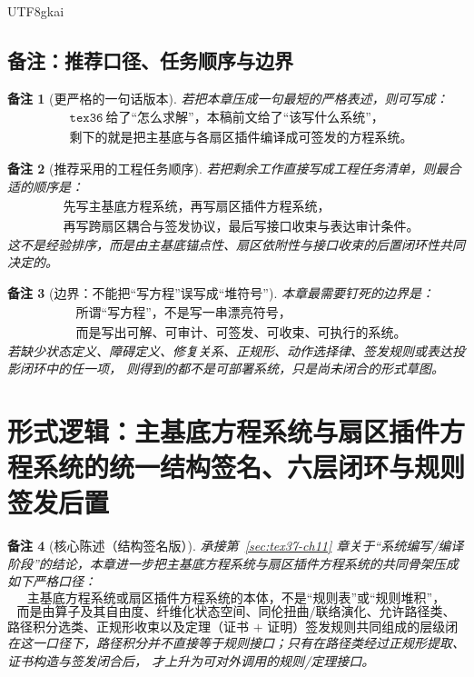 \documentclass[12pt]{article}
\newtheorem{remark}{备注}[section]
\begin{document}
\begin{CJK*}{UTF8}{gkai}
\subsection{备注：推荐口径、任务顺序与边界}
\label{subsec:tex37-ch11-remarks}

\begin{remark}[更严格的一句话版本]
若把本章压成一句最短的严格表述，则可写成：
\[
  \boxed{
    \begin{aligned}
      &\texttt{tex36}\ \text{给了“怎么求解”，本稿前文给了“该写什么系统”，}\\
      &\text{剩下的就是把主基底与各扇区插件编译成可签发的方程系统。}
    \end{aligned}
  }
\]
\end{remark}

\begin{remark}[推荐采用的工程任务顺序]
若把剩余工作直接写成工程任务清单，则最合适的顺序是：
\[
  \boxed{
    \begin{aligned}
      &\text{先写主基底方程系统，再写扇区插件方程系统，}\\
      &\text{再写跨扇区耦合与签发协议，最后写接口收束与表达审计条件。}
    \end{aligned}
  }
\]
这不是经验排序，而是由主基底锚点性、扇区依附性与接口收束的后置闭环性共同决定的。
\end{remark}

\begin{remark}[边界：不能把“写方程”误写成“堆符号”]
本章最需要钉死的边界是：
\[
  \boxed{
    \begin{aligned}
      &\text{所谓“写方程”，不是写一串漂亮符号，}\\
      &\text{而是写出可解、可审计、可签发、可收束、可执行的系统。}
    \end{aligned}
  }
\]
若缺少状态定义、障碍定义、修复关系、正规形、动作选择律、签发规则或表达投影闭环中的任一项，
则得到的都不是可部署系统，只是尚未闭合的形式草图。
\end{remark}

\clearpage

\section{形式逻辑：主基底方程系统与扇区插件方程系统的统一结构签名、六层闭环与规则签发后置}
\label{sec:tex37-ch12}

\begin{remark}[核心陈述（结构签名版）]
承接第~\ref{sec:tex37-ch11} 章关于“系统编写/编译阶段”的结论，本章进一步把主基底方程系统与扇区插件方程系统的共同骨架压成如下严格口径：
\[
  \boxed{
    \text{主基底方程系统或扇区插件方程系统的本体，不是“规则表”或“规则堆积”，}
  }
\]
\[
  \boxed{
    \text{而是由算子及其自由度、纤维化状态空间、同伦扭曲/联络演化、允许路径类、}
  }
\]
\[
  \boxed{
    \text{路径积分选类、正规形收束以及定理（证书 + 证明）签发规则共同组成的层级闭环系统。}
  }
\]
在这一口径下，路径积分并不直接等于规则接口；只有在路径类经过正规形提取、证书构造与签发闭合后，
才上升为可对外调用的规则/定理接口。
\end{remark}


\end{CJK*}
\end{document}
